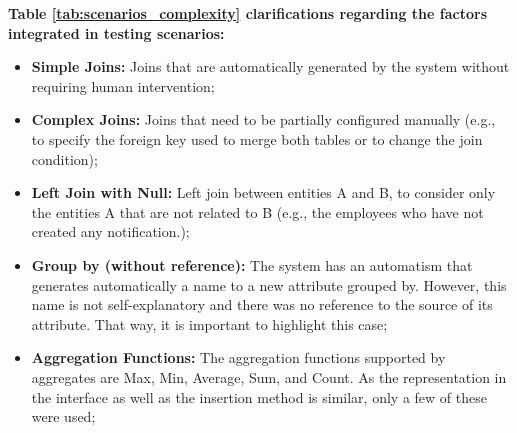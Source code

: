 \textbf{Table \ref{tab:scenarios_complexity} clarifications regarding the factors integrated in testing scenarios: }
\begin{itemize}
    \item \textbf{Simple Joins: }Joins that are automatically generated by the system without requiring human intervention;
    \item \textbf{Complex Joins: }Joins that need to be partially configured manually (e.g., to specify the foreign key used to merge both tables or to change the join condition);
    \item \textbf{Left Join with Null: }Left join between entities A and B, to consider only the entities A that are not related to B (e.g., the employees who have not created any notification.);
    \item \textbf{Group by (without reference): } The system has an automatism that generates automatically a name to a new attribute grouped by. However, this name is not self-explanatory and there was no reference to the source of its attribute. That way, it is important to highlight this case;
    \item \textbf{Aggregation Functions: } The aggregation functions supported by aggregates are Max, Min, Average, Sum, and Count. As the representation in the interface as well as the insertion method is similar, only a few of these were used;
\end{itemize}

